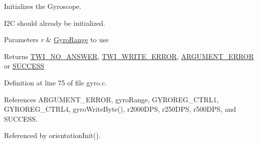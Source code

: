 Initializes the Gyroscope. 

I2\-C should already be initialized. 
\begin{DoxyParams}{Parameters}
{\em r} & \hyperlink{group__gyro_ga12b0e0572fdceaa90874f9364c862ead}{Gyro\-Range} to use \\
\hline
\end{DoxyParams}
\begin{DoxyReturn}{Returns}
\hyperlink{group__error_gga2c3e4bb40f36b262a5214e2da2bca9c5a04d5943ba652af2205c88b247e0c659c}{T\-W\-I\-\_\-\-N\-O\-\_\-\-A\-N\-S\-W\-E\-R}, \hyperlink{group__error_gga2c3e4bb40f36b262a5214e2da2bca9c5ac0e3b3463dcaf220e54794b4711708c9}{T\-W\-I\-\_\-\-W\-R\-I\-T\-E\-\_\-\-E\-R\-R\-O\-R}, \hyperlink{group__error_gga2c3e4bb40f36b262a5214e2da2bca9c5a49ccf277a69dd938c591928aa27c66cc}{A\-R\-G\-U\-M\-E\-N\-T\-\_\-\-E\-R\-R\-O\-R} or \hyperlink{group__error_gga2c3e4bb40f36b262a5214e2da2bca9c5ac7f69f7c9e5aea9b8f54cf02870e2bf8}{S\-U\-C\-C\-E\-S\-S} 
\end{DoxyReturn}


Definition at line 75 of file gyro.\-c.



References A\-R\-G\-U\-M\-E\-N\-T\-\_\-\-E\-R\-R\-O\-R, gyro\-Range, G\-Y\-R\-O\-R\-E\-G\-\_\-\-C\-T\-R\-L1, G\-Y\-R\-O\-R\-E\-G\-\_\-\-C\-T\-R\-L4, gyro\-Write\-Byte(), r2000\-D\-P\-S, r250\-D\-P\-S, r500\-D\-P\-S, and S\-U\-C\-C\-E\-S\-S.



Referenced by orientation\-Init().


